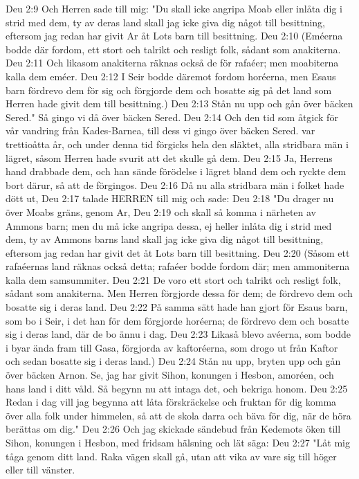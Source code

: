 Deu 2:9  Och Herren sade till mig: "Du skall icke angripa Moab eller inlåta dig i strid med dem, ty av deras land skall jag icke giva dig något till besittning, eftersom jag redan har givit Ar åt Lots barn till besittning.
Deu 2:10  (Eméerna bodde där fordom, ett stort och talrikt och resligt folk, sådant som anakiterna.
Deu 2:11  Och likasom anakiterna räknas också de för rafaéer; men moabiterna kalla dem eméer.
Deu 2:12  I Seir bodde däremot fordom horéerna, men Esaus barn fördrevo dem för sig och förgjorde dem och bosatte sig på det land som Herren hade givit dem till besittning.)
Deu 2:13  Stån nu upp och gån över bäcken Sered." Så gingo vi då över bäcken Sered.
Deu 2:14  Och den tid som åtgick för vår vandring från Kades-Barnea, till dess vi gingo över bäcken Sered. var trettioåtta år, och under denna tid förgicks hela den släktet, alla stridbara män i lägret, såsom Herren hade svurit att det skulle gå dem.
Deu 2:15  Ja, Herrens hand drabbade dem, och han sände förödelse i lägret bland dem och ryckte dem bort därur, så att de förgingos.
Deu 2:16  Då nu alla stridbara män i folket hade dött ut,
Deu 2:17  talade HERREN till mig och sade:
Deu 2:18  "Du drager nu över Moabs gräns, genom Ar,
Deu 2:19  och skall så komma i närheten av Ammons barn; men du må icke angripa dessa, ej heller inlåta dig i strid med dem, ty av Ammons barns land skall jag icke giva dig något till besittning, eftersom jag redan har givit det åt Lots barn till besittning.
Deu 2:20  (Såsom ett rafaéernas land räknas också detta; rafaéer bodde fordom där; men ammoniterna kalla dem samsummiter.
Deu 2:21  De voro ett stort och talrikt och resligt folk, sådant som anakiterna. Men Herren förgjorde dessa för dem; de fördrevo dem och bosatte sig i deras land.
Deu 2:22  På samma sätt hade han gjort för Esaus barn, som bo i Seir, i det han för dem förgjorde horéerna; de fördrevo dem och bosatte sig i deras land, där de bo ännu i dag.
Deu 2:23  Likaså blevo avéerna, som bodde i byar ända fram till Gasa, förgjorda av kaftoréerna, som drogo ut från Kaftor och sedan bosatte sig i deras land.)
Deu 2:24  Stån nu upp, bryten upp och gån över bäcken Arnon. Se, jag har givit Sihon, konungen i Hesbon, amoréen, och hans land i ditt våld. Så begynn nu att intaga det, och bekriga honom.
Deu 2:25  Redan i dag vill jag begynna att låta förskräckelse och fruktan för dig komma över alla folk under himmelen, så att de skola darra och bäva för dig, när de höra berättas om dig."
Deu 2:26  Och jag skickade sändebud från Kedemots öken till Sihon, konungen i Hesbon, med fridsam hälsning och lät säga:
Deu 2:27  "Låt mig tåga genom ditt land. Raka vägen skall gå, utan att vika av vare sig till höger eller till vänster.
